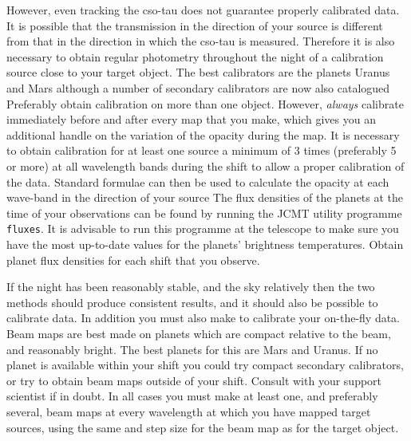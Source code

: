 \documentclass[11pt,noabs]{starlink}
\begin{document}
   However, even tracking the cso-tau does not guarantee properly
   calibrated data. It is possible that the transmission in the
   direction of your source is different from that in the direction in
   which the cso-tau is measured. Therefore it is also necessary to
   obtain regular photometry throughout the night of a calibration
   source close to your target object. The best calibrators are the
   planets Uranus and Mars
   although a number of secondary calibrators are now also catalogued
   Preferably obtain calibration on more than one object. However,
   \emph{always\/} calibrate immediately before and after every
   map that you make, which gives you an additional handle on the
   variation of the opacity during the map. It is necessary to obtain
   calibration for
   at least one source a minimum of 3 times (preferably 5 or more) at
   all wavelength bands during the shift to allow a proper calibration
   of the data. Standard formulae can then be used to calculate the
   opacity at each wave-band in the direction of your source
   The flux densities of the planets at the time of
   your observations can be
   found by running the JCMT utility programme \texttt{fluxes}. It is
   advisable to run this programme at the telescope to make sure you
   have the most up-to-date values for the planets' brightness
   temperatures. Obtain planet flux densities for each shift that you
   observe.

   If the night has been reasonably stable, and the sky relatively
   then the two methods should produce consistent results, and it should
   also be possible to calibrate
   data. In addition you must also make
   to calibrate your on-the-fly data. Beam maps are best made on planets
   which are compact relative to the beam, and reasonably bright. The
   best planets for this are Mars and Uranus. If no planet is available
   within your shift you could try compact secondary calibrators, or try
   to obtain beam maps outside of your shift. Consult with your support
   scientist if in doubt. In all cases you must make at least one, and
   preferably several, beam maps at every wavelength at which you have
   mapped target sources, using the same
   and step size for the beam map as for the target object.
\end{document}

